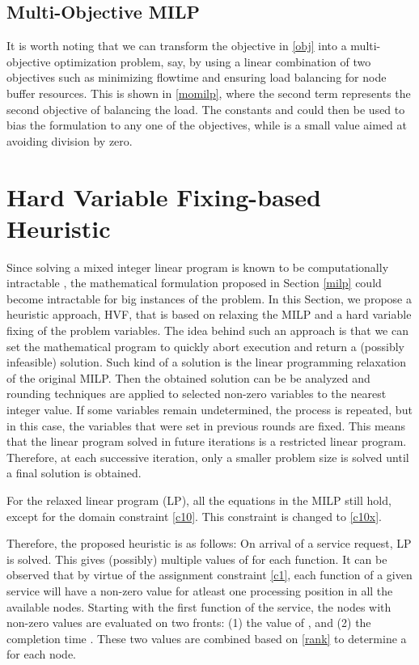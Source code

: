 \documentclass[conference]{IEEEtran}
\begin{document}
\subsection{Multi-Objective MILP}
It is worth noting that we can transform the objective in \eqref{obj} into a multi-objective optimization problem, say, by using a linear combination of two objectives such as minimizing flowtime and ensuring load balancing for node buffer resources. This is shown in \eqref{momilp}, where the second term represents the second objective of balancing the load. The constants  and 
 could then be used to bias the formulation to any one of the objectives, while  is a small value aimed at avoiding division by zero.


\section{Hard Variable Fixing-based Heuristic}\label{hardvariable}

Since solving a mixed integer linear program is known to be computationally intractable \cite{Schrijver86}, the mathematical formulation proposed in Section \ref{milp} could become intractable for big instances of the problem. In this Section, we propose a heuristic approach, HVF, that is based on relaxing the MILP and a hard variable fixing \cite{FischettiLodi2003} of the problem variables. The idea behind such an approach is that we can set the mathematical program to quickly abort execution and return a (possibly infeasible) solution. Such kind of a solution is the linear programming relaxation of the original MILP. Then the obtained solution can be be analyzed and rounding techniques are applied to selected non-zero variables to the nearest integer value. If some variables remain undetermined, the process is repeated, but in this case, the variables that were set in previous rounds are fixed. This means that the linear program solved in future iterations is a restricted linear program. Therefore, at each successive iteration, only a smaller problem size is solved until a final solution is obtained.

For the relaxed linear program (LP), all the equations in the MILP still hold, except for the domain constraint  \eqref{c10}. This constraint is changed to \eqref{c10x}.



Therefore, the proposed heuristic is as follows: On arrival of a service request, LP is solved. This gives (possibly) multiple values of  for each function. It can be observed that by virtue of the assignment constraint \eqref{c1}, each function of a given service will have a non-zero value for atleast one processing position in all the available nodes. Starting with the first function of the service, the nodes with non-zero  values are evaluated on two fronts: (1) the value of , and (2) the completion time . These two values are combined based on \eqref{rank} to determine a  for each node.
\end{document}
